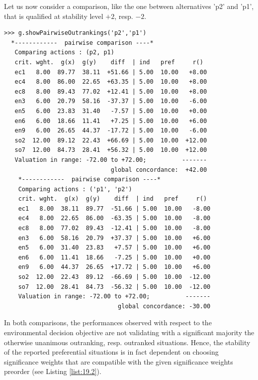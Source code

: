 Let us now consider a comparison, like the one between alternatives 'p2' and 'p1', that is qualified at stability level $+2$, resp. $-2$.
\begin{lstlisting}[caption={Comparison of alternatives 'p2' and 'p1'},label=list:19.5]
>>> g.showPairwiseOutrankings('p2','p1')
  *------------  pairwise comparison ----*
   Comparing actions : (p2, p1)
   crit. wght.  g(x)  g(y)    diff  | ind   pref     r()
   ec1   8.00  89.77  38.11  +51.66 | 5.00  10.00   +8.00
   ec4   8.00  86.00  22.65  +63.35 | 5.00  10.00   +8.00
   ec8   8.00  89.43  77.02  +12.41 | 5.00  10.00   +8.00
   en3   6.00  20.79  58.16  -37.37 | 5.00  10.00   -6.00
   en5   6.00  23.83  31.40   -7.57 | 5.00  10.00   +0.00
   en6   6.00  18.66  11.41   +7.25 | 5.00  10.00   +6.00
   en9   6.00  26.65  44.37  -17.72 | 5.00  10.00   -6.00
   so2  12.00  89.12  22.43  +66.69 | 5.00  10.00  +12.00
   so7  12.00  84.73  28.41  +56.32 | 5.00  10.00  +12.00
   Valuation in range: -72.00 to +72.00;          -------
                              global concordance:  +42.00
    *------------  pairwise comparison ----*
    Comparing actions : ('p1', 'p2')
    crit. wght.  g(x)  g(y)    diff  | ind   pref     r()
    ec1   8.00  38.11  89.77  -51.66 | 5.00  10.00   -8.00
    ec4   8.00  22.65  86.00  -63.35 | 5.00  10.00   -8.00
    ec8   8.00  77.02  89.43  -12.41 | 5.00  10.00   -8.00
    en3   6.00  58.16  20.79  +37.37 | 5.00  10.00   +6.00
    en5   6.00  31.40  23.83   +7.57 | 5.00  10.00   +6.00 
    en6   6.00  11.41  18.66   -7.25 | 5.00  10.00   +0.00
    en9   6.00  44.37  26.65  +17.72 | 5.00  10.00   +6.00
    so2  12.00  22.43  89.12  -66.69 | 5.00  10.00  -12.00
    so7  12.00  28.41  84.73  -56.32 | 5.00  10.00  -12.00
    Valuation in range: -72.00 to +72.00;          -------
                                global concordance: -30.00
\end{lstlisting}
In both comparisons, the performances observed with respect to the environmental decision objective are not validating with a significant majority the otherwise unanimous outranking, resp. outranked situations. Hence, the stability of the reported preferential situations is in fact dependent on choosing significance weights that are compatible with the given significance weights preorder (see Listing \ref{list:19.2}).

